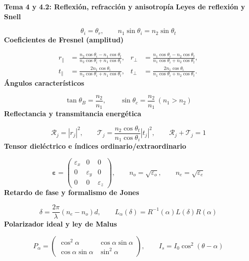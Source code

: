 \documentclass[12pt, a4paper]{article}
\theoremstyle{plain}
\theoremstyle{definition}
\theoremstyle{remark}
\newcommand{\formulaname}[1]{\textbf{#1}\par\vspace{2pt}}
\begin{document}
\begin{mdframed}[style=resultado]
\textbf{Tema 4 y 4.2: Reflexión, refracción y anisotropía}
\formulaname{Leyes de reflexión y Snell}
\[
\theta_i=\theta_r,
\qquad
n_1\sin\theta_i=n_2\sin\theta_t
\]
\formulaname{Coeficientes de Fresnel (amplitud)}
\[
\begin{aligned}
r_\parallel&=\frac{n_2\cos\theta_i-n_1\cos\theta_t}{n_2\cos\theta_i+n_1\cos\theta_t},
&
r_\perp&=\frac{n_1\cos\theta_i-n_2\cos\theta_t}{n_1\cos\theta_i+n_2\cos\theta_t},
\\
t_\parallel&=\frac{2n_1\cos\theta_i}{n_2\cos\theta_i+n_1\cos\theta_t},
&
t_\perp&=\frac{2n_1\cos\theta_i}{n_1\cos\theta_i+n_2\cos\theta_t}.
\end{aligned}
\]
\formulaname{Ángulos característicos}
\[
\tan\theta_B=\frac{n_2}{n_1},
\qquad
\sin\theta_c=\frac{n_2}{n_1}\ (n_1>n_2)
\]
\formulaname{Reflectancia y transmitancia energética}
\[
\mathcal{R}_j=|r_j|^2,
\qquad
\mathcal{T}_j=\frac{n_2\cos\theta_t}{n_1\cos\theta_i}|t_j|^2,
\qquad
\mathcal{R}_j+\mathcal{T}_j=1
\]
\formulaname{Tensor dieléctrico e índices ordinario/extraordinario}
\[
\boldsymbol{\varepsilon}=
\begin{pmatrix}
\varepsilon_x&0&0\\
0&\varepsilon_y&0\\
0&0&\varepsilon_z
\end{pmatrix},
\qquad
n_o=\sqrt{\varepsilon_o},
\qquad
n_e=\sqrt{\varepsilon_e}
\]
\formulaname{Retardo de fase y formalismo de Jones}
\[
\delta=\frac{2\pi}{\lambda}(n_e-n_o)d,
\qquad
L_\alpha(\delta)=R^{-1}(\alpha)L(\delta)R(\alpha)
\]
\formulaname{Polarizador ideal y ley de Malus}
\[
P_\alpha=
\begin{pmatrix}
\cos^2\alpha & \cos\alpha\sin\alpha\\
\cos\alpha\sin\alpha & \sin^2\alpha
\end{pmatrix},
\qquad
I_s=I_0\cos^2(\theta-\alpha)
\]
\end{mdframed}
\end{document}
